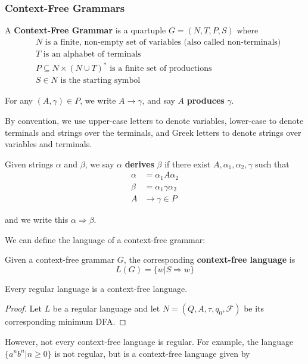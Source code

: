 \subsubsection{Context-Free Grammars}\label{subsec:context-free-grammars}
\begin{definition}
    A \textbf{Context-Free Grammar} is a quartuple \(G=(N, T, P, S)\) where 
          \begin{align*}
                & N\text{ is a finite, non-empty set of variables (also called non-terminals)}\\
                & T\text{ is an alphabet of terminals}\\
                & P\subseteq N\times{(N\cup T)}^*\text{ is a finite set of productions}\\
                & S\in N\text{ is the starting symbol}
          \end{align*}

          For any \((A, \gamma)\in P\), we write \(A\to\gamma \), and say \(A\) \textbf{produces} \(\gamma \). 
\end{definition}

By convention, we use upper-case letters to denote variables, lower-case to denote terminals and strings over the terminals, and Greek letters to denote strings over variables and terminals.

\begin{definition}
    Given strings \(\alpha \) and \(\beta \), we say \(\alpha \) \textbf{derives} \(\beta \) if there exist \(A, \alpha_1,\alpha_2,\gamma \) such that 
    \begin{align*}
          \alpha &= \alpha_1A\alpha_2\\
          \beta  &= \alpha_1\gamma\alpha_2\\
          A&\to \gamma\in P
    \end{align*}

    and we write this \(\alpha\Rightarrow\beta \). 
\end{definition}

We can define the language of a context-free grammar:

\begin{definition}
      Given a context-free grammar \(G\), the corresponding \textbf{context-free language} is \[L(G)=\{w|S\Rightarrow w\} \]
\end{definition}

\begin{theorem}
      Every regular language is a context-free language. 
\end{theorem}

\begin{proof}
      Let \(L\) be a regular language and let \(N=(Q, A, \tau, q_0, \mathcal{F})\) be its corresponding minimum DFA\@. 
\end{proof}

However, not every context-free language is regular. For example, the language \( \{a^n b^n|n\geq0\} \) is not regular, but is a context-free language given by